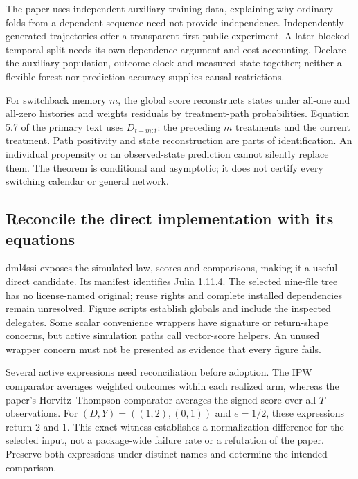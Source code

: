 The paper uses independent auxiliary training data, explaining why ordinary
folds from a dependent sequence need not provide independence. Independently
generated trajectories offer a transparent first public experiment. A later
blocked temporal split needs its own dependence argument and cost accounting.
Declare the auxiliary population, outcome clock and measured state together;
neither a flexible forest nor prediction accuracy supplies causal restrictions.
\citep{exec25_onet_paper,exec25_onet_choice}

For switchback memory $m$, the global score reconstructs states under all-one
and all-zero histories and weights residuals by treatment-path probabilities.
Equation 5.7 of the primary text uses $D_{t-m:t}$: the preceding $m$ treatments
and the current treatment. Path positivity and state reconstruction are parts
of identification. An individual propensity or an observed-state prediction
cannot silently replace them. The theorem is conditional and asymptotic; it
does not certify every switching calendar or general network.
\citep{exec25_onet_paper}

\subsection{Reconcile the direct implementation with its equations}

dml4ssi exposes the simulated law, scores and comparisons, making it a useful
direct candidate. Its manifest identifies Julia 1.11.4. The selected nine-file
tree has no license-named original; reuse rights and complete installed
dependencies remain unresolved. Figure scripts establish globals and include
the inspected delegates. Some scalar convenience wrappers have signature or
return-shape concerns, but active simulation paths call vector-score helpers.
An unused wrapper concern must not be presented as evidence that every figure
fails.~\citep{exec25_onet_dml}

Several active expressions need reconciliation before adoption. The IPW
comparator averages weighted outcomes within each realized arm, whereas the
paper's Horvitz--Thompson comparator averages the signed score over all $T$
observations. For $(D,Y)=((1,2),(0,1))$ and $e=1/2$, these expressions return
$2$ and $1$. This exact witness establishes a normalization difference for
the selected input, not a package-wide failure rate or a refutation of the
paper. Preserve both expressions under distinct names and determine the
intended comparison.~\citep{exec25_onet_dml,exec25_onet_paper,exec25_onet_choice}

